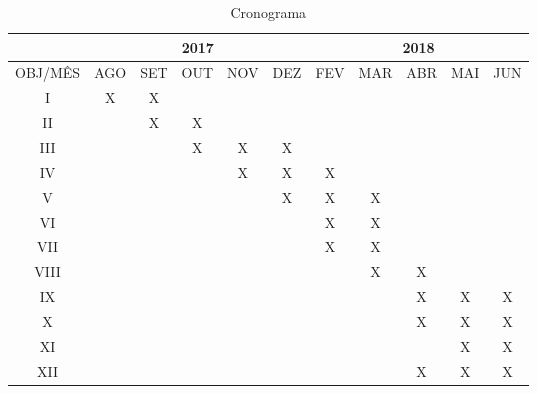 \documentclass[
	12pt,				%
	openright,			%
	oneside,			%
	a4paper,			%
	english,			%
	french,				%
	spanish,			%
	brazil,				%
	]{abntex2}
\begin{document}
\begin{table}[h!]
	\centering
	\caption{Cronograma}
	\label{my-label}
	\begin{tabular}{c|c|c|c|c|c|c|c|c|c|c|}
		\cline{2-11}
		& \multicolumn{5}{c|}{2017}   & \multicolumn{5}{c|}{2018}   \\ \hline
		\multicolumn{1}{|c|}{OBJ/MÊS} & AGO & SET & OUT & NOV & DEZ & FEV & MAR & ABR & MAI & JUN \\ \hline
		\multicolumn{1}{|c|}{I}		&X&X& & & & & & & &\\ \hline
		\multicolumn{1}{|c|}{II}	& &X&X& & & & & & &\\ \hline
		\multicolumn{1}{|c|}{III}	& & &X&X&X& & & & &\\ \hline
		\multicolumn{1}{|c|}{IV}	& & & &X&X&X& & & &\\ \hline
		\multicolumn{1}{|c|}{V}		& & & & &X&X&X& & &\\ \hline
		\multicolumn{1}{|c|}{VI}	& & & & & &X&X& & &\\ \hline
		\multicolumn{1}{|c|}{VII}	& & & & & &X&X& & &\\ \hline
		\multicolumn{1}{|c|}{VIII}	& & & & & & &X&X& &\\ \hline
		\multicolumn{1}{|c|}{IX}	& & & & & & & &X&X&X\\ \hline
		\multicolumn{1}{|c|}{X}		& & & & & & & &X&X&X\\ \hline
		\multicolumn{1}{|c|}{XI}	& & & & & & & & &X&X\\ \hline
		\multicolumn{1}{|c|}{XII}	& & & & & & & &X&X&X\\ \hline
	\end{tabular}
\end{table}


\end{document}
